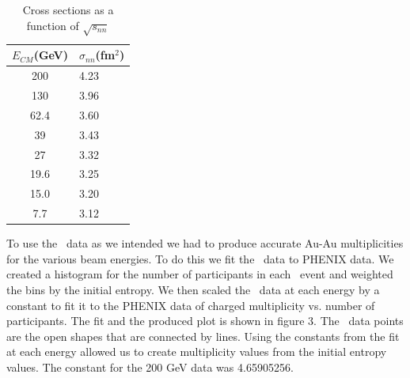 \documentclass[11pt]{article}
\begin{document}
\begin{center}
\begin{table}
\centering
\caption{Cross sections as a function of $\sqrt{s_{nn}}$}
\begin{tabular}{|c|l|}
\hline
$E_{CM}$(GeV)& $\sigma_{nn}$(fm$^2$) \\
\hline
200 & 4.23 \\
\hline
130 & 3.96 \\
\hline
62.4 & 3.60 \\
\hline
39 & 3.43 \\
\hline
27 & 3.32 \\
\hline
19.6 & 3.25 \\
\hline
15.0 & 3.20 \\
\hline
7.7 & 3.12 \\
\hline
\end{tabular}
\label{}
\end{table}
\end{center}

To use the \trento\ data as we intended we had to produce accurate Au-Au multiplicities for the various beam energies. To do this we fit the \trento\ data to PHENIX data. We created a histogram for the number of participants in each \trento\ event and weighted the bins by the initial entropy. We then scaled the \trento\ data at each energy by a constant to fit it to the PHENIX data of charged multiplicity vs. number of participants. The fit and the produced plot is shown in figure 3. The \trento\ data points are the open shapes that are connected by lines. Using the constants from the fit at each energy allowed us to create multiplicity values from the initial entropy values. The constant for the 200 GeV data was 4.65905256.
\end{document}
